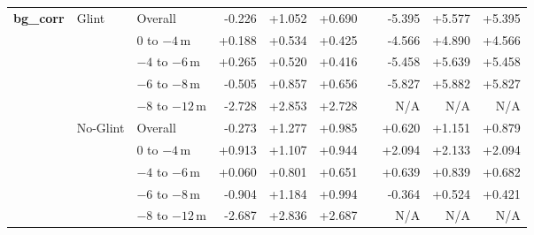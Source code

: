 \begin{table}[htbp]
{\begin{tabular}{lll rrr c rrr}
\multirow{10}{*}{\textbf{bg\_corr}} & \multirow{5}{*}{Glint} & Overall              &  -0.226 & +1.052 & +0.690 & &  -5.395 & +5.577 & +5.395 \\
                           &                      & $0$ to $-4$\,m       &  +0.188 & +0.534 & +0.425 & &  -4.566 & +4.890 & +4.566 \\
                           &                      & $-4$ to $-6$\,m      &  +0.265 & +0.520 & +0.416 & &  -5.458 & +5.639 & +5.458 \\
                           &                      & $-6$ to $-8$\,m      &  -0.505 & +0.857 & +0.656 & &  -5.827 & +5.882 & +5.827 \\
                           &                      & $-8$ to $-12$\,m     &  -2.728 & +2.853 & +2.728 & &     N/A &   N/A &   N/A \\
\cmidrule(lr){2-10}
                           & \multirow{5}{*}{No-Glint} & Overall              &  -0.273 & +1.277 & +0.985 & &  +0.620 & +1.151 & +0.879 \\
                           &                      & $0$ to $-4$\,m       &  +0.913 & +1.107 & +0.944 & &  +2.094 & +2.133 & +2.094 \\
                           &                      & $-4$ to $-6$\,m      &  +0.060 & +0.801 & +0.651 & &  +0.639 & +0.839 & +0.682 \\
                           &                      & $-6$ to $-8$\,m      &  -0.904 & +1.184 & +0.994 & &  -0.364 & +0.524 & +0.421 \\
                           &                      & $-8$ to $-12$\,m     &  -2.687 & +2.836 & +2.687 & &     N/A &   N/A &   N/A \\
\midrule


\end{tabular}}
\end{table}
